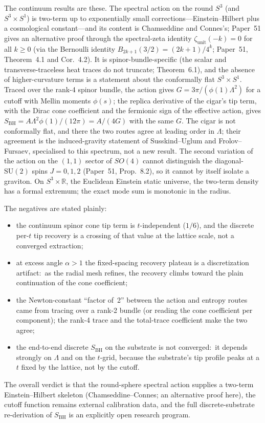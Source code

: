 \documentclass[aps,pra,twocolumn,superscriptaddress,longbibliography]{revtex4-2}
\begin{document}
The continuum results are these.  The spectral action on the round $S^3$
(and $S^3\times S^1$) is two-term up to exponentially small
corrections---Einstein--Hilbert plus a cosmological constant---and its
content is Chamseddine and Connes's; Paper~51 gives an alternative proof
through the spectral-zeta identity $\zeta_{\text{unit}}(-k)=0$ for all
$k\ge0$ (via the Bernoulli identity $B_{2k+1}(3/2)=(2k+1)/4^k$;
Paper~51, Theorem~4.1 and Cor.~4.2).  It is spinor-bundle-specific (the
scalar and transverse-traceless heat traces do not truncate;
Theorem~6.1), and the absence of higher-curvature terms is a statement
about the conformally flat $S^3\times S^1$.  Traced over the rank-4 spinor
bundle, the action gives $G=3\pi/(\phi(1)\Lambda^2)$ for a cutoff with
Mellin moments $\phi(s)$; the replica derivative of the cigar's tip term,
with the Dirac cone coefficient and the fermionic sign of the effective
action, gives $S_{\text{BH}}=A\Lambda^2\phi(1)/(12\pi)=A/(4G)$ with the same
$G$.  The cigar is not conformally flat, and there the two routes agree at
leading order in $\Lambda$; their agreement is the induced-gravity
statement of Susskind--Uglum and Frolov--Fursaev, specialised to this
spectrum, not a new result.  The second variation of the action on the
$(1,1)$ sector of $SO(4)$ cannot distinguish the diagonal-$\mathrm{SU}(2)$
spins $J=0,1,2$ (Paper~51, Prop.~8.2), so it cannot by itself isolate a
graviton.  On $S^3\times\mathbb{R}$, the Euclidean Einstein static
universe, the two-term density has a formal extremum; the exact mode sum
is monotonic in the radius.

The negatives are stated plainly:
\begin{itemize}
\item the continuum spinor cone tip term is $t$-independent ($1/6$), and
the discrete per-$t$ tip recovery is a crossing of that value at the
lattice scale, not a converged extraction;
\item at excess angle $\alpha>1$ the fixed-spacing recovery plateau is a
discretization artifact:\ as the radial mesh refines, the recovery climbs
toward the plain continuation of the cone coefficient;
\item the Newton-constant ``factor of~2'' between the action and entropy
routes came from tracing over a rank-2 bundle (or reading the cone
coefficient per component); the rank-4 trace and the total-trace
coefficient make the two agree;
\item the end-to-end discrete $S_{\text{BH}}$ on the substrate is not
converged:\ it depends strongly on $\Lambda$ and on the $t$-grid, because
the substrate's tip profile peaks at a $t$ fixed by the lattice, not by the
cutoff.
\end{itemize}
The overall verdict is that the round-sphere spectral action supplies a
two-term Einstein--Hilbert skeleton (Chamseddine--Connes; an alternative
proof here), the cutoff function remains external calibration data, and
the full discrete-substrate re-derivation of $S_{\text{BH}}$ is an
explicitly open research program.
\end{document}
